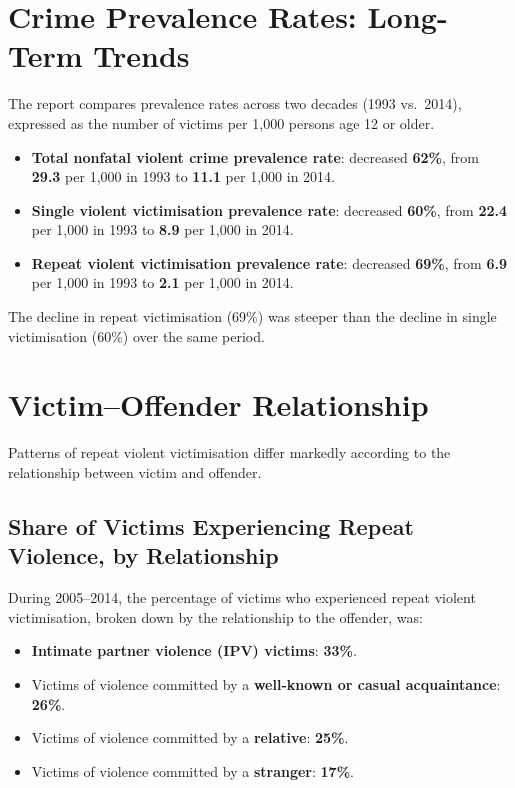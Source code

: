 \documentclass[11pt,a4paper,openany]{report}
\theoremstyle{definition}
\theoremstyle{plain}
\theoremstyle{remark}
\begin{document}
\section{Crime Prevalence Rates: Long-Term Trends}

The report compares prevalence rates across two decades (1993 vs.\ 2014), expressed as the number of victims per 1{,}000 persons age 12 or older.

\begin{itemize}
    \item \textbf{Total nonfatal violent crime prevalence rate}: decreased \textbf{62\%}, from \textbf{29.3} per 1{,}000 in 1993 to \textbf{11.1} per 1{,}000 in 2014.
    \item \textbf{Single violent victimisation prevalence rate}: decreased \textbf{60\%}, from \textbf{22.4} per 1{,}000 in 1993 to \textbf{8.9} per 1{,}000 in 2014.
    \item \textbf{Repeat violent victimisation prevalence rate}: decreased \textbf{69\%}, from \textbf{6.9} per 1{,}000 in 1993 to \textbf{2.1} per 1{,}000 in 2014.
\end{itemize}

The decline in repeat victimisation (69\%) was steeper than the decline in single victimisation (60\%) over the same period.

\section{Victim--Offender Relationship}

Patterns of repeat violent victimisation differ markedly according to the relationship between victim and offender.

\subsection{Share of Victims Experiencing Repeat Violence, by Relationship}

During 2005--2014, the percentage of victims who experienced repeat violent victimisation, broken down by the relationship to the offender, was:

\begin{itemize}
    \item \textbf{Intimate partner violence (IPV) victims}: \textbf{33\%}.
    \item Victims of violence committed by a \textbf{well-known or casual acquaintance}: \textbf{26\%}.
    \item Victims of violence committed by a \textbf{relative}: \textbf{25\%}.
    \item Victims of violence committed by a \textbf{stranger}: \textbf{17\%}.
\end{itemize}
\end{document}
